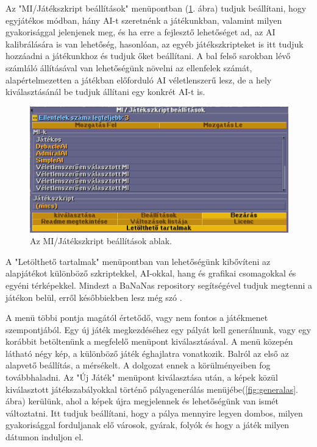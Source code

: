 Az "MI/Játékszkript beállítások" menüpontban (\ref{fig:mibeall}. ábra) tudjuk beállítani, hogy egyjátékos módban, hány AI-t szeretnénk a játékunkban, valamint milyen gyakorisággal jelenjenek meg, és ha erre a fejlesztő lehetőséget ad, az AI kalibrálására is van lehetőség, hasonlóan, az egyéb játékszkripteket is itt tudjuk hozzáadni a játékunkhoz és tudjuk őket beállítani. A bal felső sarokban lévő számláló állításával van lehetőségünk növelni az ellenfelek számát, alapértelmezetten a játékban előforduló AI véletlenszerű lesz, de a hely kiválasztásánál be tudjuk állítani egy konkrét AI-t is.

\begin{figure}[h!]
	\centering
	\includegraphics[scale=0.6]{images/mibeall.png}
	\caption{Az MI/Játékszkript beállítások ablak.}
	\label{fig:mibeall}
\end{figure}

A "Letölthető tartalmak" menüpontban van lehetőségünk kibővíteni az alapjátékot különböző szkriptekkel, AI-okkal, hang és grafikai csomagokkal és egyéni térképekkel. Mindezt a BaNaNas repository segítségével tudjuk megtenni a játékon belül, erről későbbiekben lesz még szó \cite{openttdbananas}. 

A menü többi pontja magától értetődő, vagy nem fontos a játékmenet szempontjából. Egy új játék megkezdéséhez egy pályát kell generálnunk, vagy egy korábbit betöltenünk a megfelelő menüpont kiválasztásával. A menü közepén látható négy kép, a különböző játék éghajlatra vonatkozik. Balról az első az alapvető beállítás, a mérsékelt. A dolgozat ennek a körülményeiben fog továbbhaladni. Az "Új Játék" menüpont kiválasztása után, a képek közül kiválasztott játékszabályokkal történő pályagenerálás menüjébe(\ref{fig:generalas}. ábra) kerülünk, ahol a képek újra megjelennek és lehetőségünk van ismét változtatni. Itt tudjuk beállítani, hogy a pálya mennyire legyen dombos, milyen gyakorisággal forduljanak elő városok, gyárak, folyók és hogy a játék milyen dátumon induljon el.

